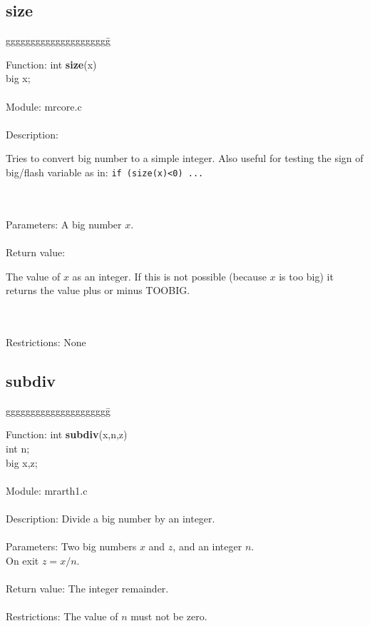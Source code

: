 \pagebreak
\subsection{size}

\begin{tabbing}
ggggggggggggggggggggg\= \kill

      Function:      \>int {\bf size}(x) \\
                     \>big x; \\
      \ \\
      Module:        \>mrcore.c \\
      \ \\
      Description:   \>
                     \parbox[t]{3 in}
                     {Tries to convert big number to a simple integer.
                     Also useful for testing the sign of big/flash variable
                     as in: {\tt if (size(x)<0) ...}} \\
      \ \\
      Parameters:    \>A big number $x$. \\
      \ \\
      Return value:  \>
                     \parbox[t]{3in}
                     {The value of $x$ as an integer. If this is not possible
                     (because $x$ is too big) it returns the value plus or 
                     minus TOOBIG.} \\
      \ \\
      Restrictions:  \>None \\
                                          
\end{tabbing}

\subsection{subdiv}

\begin{tabbing}
ggggggggggggggggggggg\= \kill

      Function:      \>int {\bf subdiv}(x,n,z) \\
                     \>int n; \\
                     \>big x,z; \\
      \ \\
      Module:        \>mrarth1.c \\
      \ \\
      Description:   \>Divide a big number by an integer. \\
      \ \\
      Parameters:    \>Two big numbers $x$ and $z$, and an integer $n$. \\
                     \>On exit $z=x/n$. \\
      \ \\
      Return value:  \>The integer remainder. \\
      \ \\
      Restrictions:  \>The value of $n$ must not be zero. \\

\end{tabbing}

